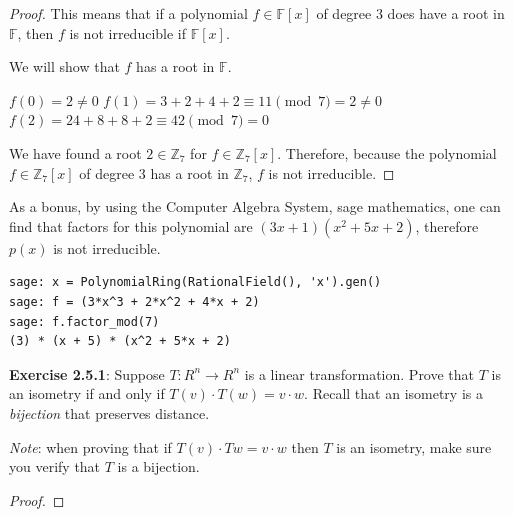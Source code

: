 \documentclass[a4paper]{article}
\begin{document}
\begin{myparindent}{0pt}
\begin{proof}
  This means that if a polynomial
  $f \in \mathbb{F}[x]$ of degree 3 does have a root in $\mathbb{F}$, then
  $f$ is not irreducible if $\mathbb{F}[x]$. \newline

  We will show that $f$ has a root in $\mathbb{F}$. \newline

  $f(0) = 2 \neq 0$ \newline
  $f(1) = 3 + 2 + 4 + 2 \equiv 11 \pmod 7 = 2 \neq 0$ \newline
  $f(2) = 24 + 8 + 8 + 2 \equiv 42 \pmod 7 = 0$ \newline

  We have found a root $2 \in \mathbb{Z}_7$ for $f \in \mathbb{Z}_7[x]$.
  Therefore, because the polynomial $f \in \mathbb{Z}_7[x]$ of degree 3 has a
  root in $\mathbb{Z}_7$, $f$ is not irreducible.
\end{proof}

As a bonus, by using the Computer Algebra System, sage mathematics,
one can find that factors for this polynomial are $(3x + 1)(x^2 + 5x + 2)$,
therefore $p(x)$ is not irreducible.

\begin{verbatim}
sage: x = PolynomialRing(RationalField(), 'x').gen()
sage: f = (3*x^3 + 2*x^2 + 4*x + 2)
sage: f.factor_mod(7)
(3) * (x + 5) * (x^2 + 5*x + 2)
\end{verbatim}

\textbf{Exercise 2.5.1}:
Suppose $T:R^n \rightarrow R^n$ is a linear transformation. Prove that $T$ is
an isometry if and only if $T(v) \cdot T(w) = v \cdot w$. Recall that an
isometry is a \textit{bijection} that preserves distance.

\textit{Note}: when
proving that if $T(v) \cdot T{w} = v \cdot w$ then $T$ is an isometry,
make sure you verify that $T$ is a bijection.
\newline
\begin{proof}
\end{proof}

\end{myparindent}
\end{document}
